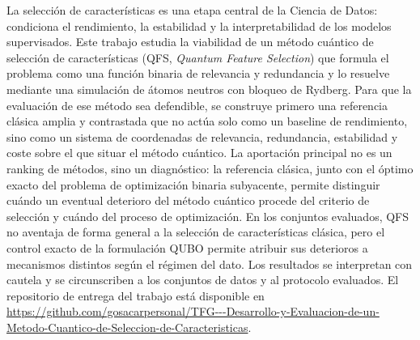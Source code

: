 \documentclass[twoside,spanish,a4paper,12pt]{tfg}
\makeatletter
\renewcommand*{\cleardoublepage}{\clearpage\if@twoside
  \ifodd\c@page\else\hbox{}\thispagestyle{empty}\newpage
  \if@twocolumn\hbox{}\newpage\fi\fi\fi}
\makeatother
\begin{document}
\begin{resumen}
  La selección de características es una etapa central de la Ciencia de
  Datos: condiciona el rendimiento, la estabilidad y la interpretabilidad
  de los modelos supervisados. Este trabajo estudia la viabilidad de un
  método cuántico de selección de características (QFS, \textit{Quantum
  Feature Selection}) que formula el problema como una función binaria de
  relevancia y redundancia y lo resuelve mediante una simulación de
  átomos neutros con bloqueo de Rydberg. Para que la evaluación de ese
  método sea defendible, se construye primero una referencia clásica
  amplia y contrastada que no actúa solo como un baseline de rendimiento,
  sino como un sistema de coordenadas de relevancia, redundancia,
  estabilidad y coste sobre el que situar el método cuántico. La
  aportación principal no es un ranking de métodos, sino un diagnóstico:
  la referencia clásica, junto con el óptimo exacto del problema de
  optimización binaria subyacente, permite distinguir cuándo un eventual
  deterioro del método cuántico procede del criterio de selección y
  cuándo del proceso de optimización. En los conjuntos evaluados, QFS no
  aventaja de forma general a la selección de características clásica, pero
  el control exacto de la formulación QUBO permite atribuir sus
  deterioros a mecanismos distintos según el régimen del dato. Los
  resultados se interpretan con cautela y se circunscriben a los conjuntos
  de datos y al protocolo evaluados. El repositorio de entrega del trabajo
  está disponible en
  \url{https://github.com/gosacarpersonal/TFG---Desarrollo-y-Evaluacion-de-un-Metodo-Cuantico-de-Seleccion-de-Caracteristicas}.
\end{resumen}
\cleardoublepage{}

\begin{abstract}
  Feature selection is a central Data Science task: it determines the
  performance, stability and interpretability of supervised models. This
  work studies the feasibility of a quantum feature selection method
  (QFS, \textit{Quantum Feature Selection}) that casts the problem as a
  binary relevance and redundancy objective and solves it through a
  neutral-atom simulation based on the Rydberg blockade. To make the
  evaluation of that method defensible, a broad and audited classical
  reference is built first; it acts not only as a performance baseline
  but as a coordinate system of relevance, redundancy, stability and cost
  on which to place the quantum method. The main contribution is not a
  ranking of methods, but a diagnosis: the classical reference, together
  with the exact optimum of the underlying binary optimization problem,
  makes it possible to tell whether any deterioration of the quantum
  method stems from the selection criterion or from the optimization
  process. Results are interpreted with caution and are restricted to the
  datasets and the protocol that were evaluated. The final submission
  repository is available at
  \url{https://github.com/gosacarpersonal/TFG---Desarrollo-y-Evaluacion-de-un-Metodo-Cuantico-de-Seleccion-de-Caracteristicas}.
\end{abstract}
\cleardoublepage{}
\end{document}
